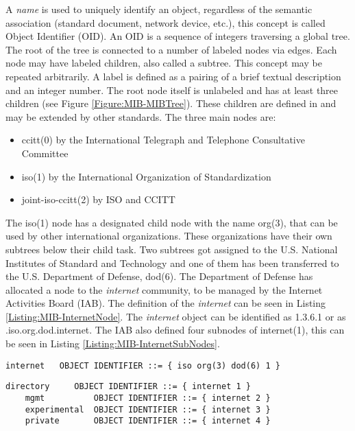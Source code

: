 A \textit{name} is used to uniquely identify an object, regardless of the semantic association (standard document, network device, etc.), this concept is called Object Identifier (OID). An OID is a sequence of integers traversing a global tree. The root of the tree is connected to a number of labeled nodes via edges. Each node may have labeled children, also called a subtree. This concept may be repeated arbitrarily. A label is defined as a pairing of a brief textual description and an integer number. The root node itself is unlabeled and has at least three children (see Figure \ref{Figure:MIB-MIBTree}). These children are defined in \cite{RFC:RFC1155:1990} and may be extended by other standards. The three main nodes are:

\begin{minipage}{\textwidth}
\begin{itemize}
    \item ccitt(0) by the International Telegraph and Telephone Consultative Committee
    \item iso(1) by the International Organization of Standardization
    \item joint-iso-ccitt(2) by ISO and CCITT
\end{itemize}
\end{minipage}


The iso(1) node has a designated child node with the name org(3), that can be used by other international organizations. These organizations have their own subtrees below their child task. Two subtrees got assigned to the U.S. National Institutes of Standard and Technology and one of them has been transferred to the U.S. Department of Defense, dod(6). The Department of Defense has allocated a node to the \textit{internet} community, to be managed by the Internet Activities Board (IAB). The definition of the \textit{internet} can be seen in Listing \ref{Listing:MIB-InternetNode}. The \textit{internet} object can be identified as 1.3.6.1 or as .iso.org.dod.internet. The IAB also defined four subnodes of internet(1), this can be seen in Listing \ref{Listing:MIB-InternetSubNodes}.

\begin{lstlisting}[label=Listing:MIB-InternetNode,captionpos=b,caption={Definition of a node, internet node used as an example (from \cite{RFC:RFC1155:1990})}]
    internet   OBJECT IDENTIFIER ::= { iso org(3) dod(6) 1 }
\end{lstlisting}

\pagebreak
\begin{lstlisting}[label=Listing:MIB-InternetSubNodes,captionpos=b,caption={Definition of subnodes, internet subnodes used as an example (from \cite{RFC:RFC1155:1990})}]
    directory     OBJECT IDENTIFIER ::= { internet 1 }
    mgmt          OBJECT IDENTIFIER ::= { internet 2 }
    experimental  OBJECT IDENTIFIER ::= { internet 3 }
    private       OBJECT IDENTIFIER ::= { internet 4 }
\end{lstlisting}


